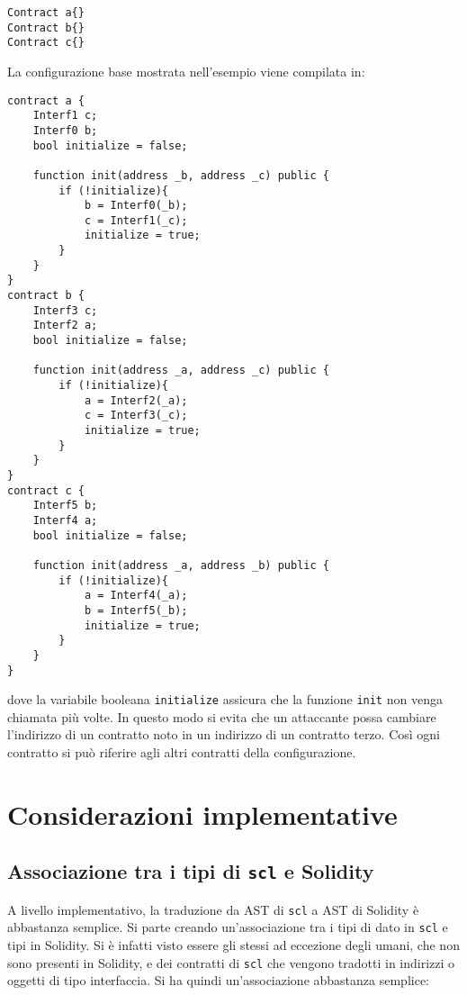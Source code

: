 \documentclass[12pt,a4paper]{report}
\begin{document}
\begin{verbatim}
Contract a{}
Contract b{}
Contract c{}
\end{verbatim}

La configurazione base mostrata nell'esempio viene compilata in:

\begin{verbatim}
contract a {
    Interf1 c;
    Interf0 b;
    bool initialize = false;
    
    function init(address _b, address _c) public {
        if (!initialize){
            b = Interf0(_b);
            c = Interf1(_c);
            initialize = true;
        }
    }
}
contract b {
    Interf3 c;
    Interf2 a;
    bool initialize = false;
    
    function init(address _a, address _c) public {
        if (!initialize){
            a = Interf2(_a);
            c = Interf3(_c);
            initialize = true;
        }
    }
}
contract c {
    Interf5 b;
    Interf4 a;
    bool initialize = false;

    function init(address _a, address _b) public {
        if (!initialize){
            a = Interf4(_a);
            b = Interf5(_b);
            initialize = true;
        }
    }
}
\end{verbatim}

dove la variabile booleana \texttt{initialize} assicura che la funzione
\texttt{init} non venga chiamata più volte. In questo modo si evita che
un attaccante possa cambiare l'indirizzo di un contratto noto in un
indirizzo di un contratto terzo. Così ogni contratto si può riferire
agli altri contratti della configurazione.

\hypertarget{considerazioni-implementative}{%
\section{Considerazioni
implementative}\label{considerazioni-implementative}}

\hypertarget{associazione-tra-i-tipi-di-scl-e-solidity}{%
\subsection{\texorpdfstring{Associazione tra i tipi di \texttt{scl} e
Solidity}{Associazione tra i tipi di scl e Solidity}}\label{associazione-tra-i-tipi-di-scl-e-solidity}}

A livello implementativo, la traduzione da AST di \texttt{scl} a AST di
Solidity è abbastanza semplice. Si parte creando un'associazione tra i
tipi di dato in \texttt{scl} e tipi in Solidity. Si è infatti visto
essere gli stessi ad eccezione degli umani, che non sono presenti in
Solidity, e dei contratti di \texttt{scl} che vengono tradotti in
indirizzi o oggetti di tipo interfaccia. Si ha quindi un'associazione
abbastanza semplice:
\end{document}
